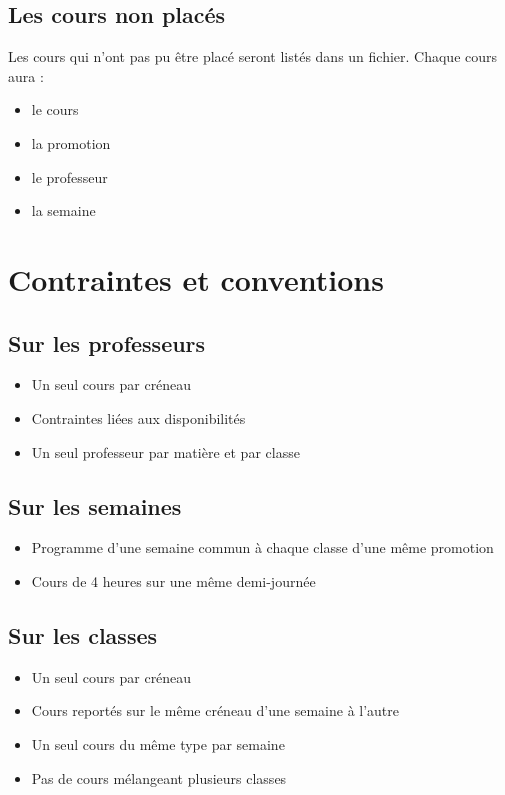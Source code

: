 \documentclass{beamer}
\begin{document}
\subsection{Les cours non placés}
\begin{frame}
Les cours qui n'ont pas pu être placé seront listés dans un fichier.
Chaque cours aura : 
\begin{itemize}
\item le cours
\item la promotion
\item le professeur
\item la semaine
\end{itemize}
\end{frame}



\section{Contraintes et conventions}

\subsection{Sur les professeurs}
\begin{frame}
\begin{itemize}
\item Un seul cours par créneau
\item Contraintes liées aux disponibilités
\item Un seul professeur par matière et par classe
\end{itemize}
\end{frame}

\subsection{Sur les semaines}
\begin{frame}
\begin{itemize}
\item Programme d'une semaine commun à chaque classe d'une même promotion
\item Cours de 4 heures sur une même demi-journée
\end{itemize}
\end{frame}

\subsection{Sur les classes}
\begin{frame}
\begin{itemize}
\item Un seul cours par créneau
\item Cours reportés sur le même créneau d'une semaine à l'autre
\item Un seul cours du même type par semaine
\item Pas de cours mélangeant plusieurs classes
\end{itemize}
\end{frame}
\end{document}
